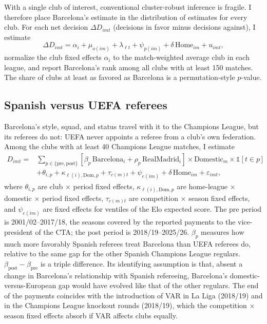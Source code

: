 With a single club of interest, conventional cluster-robust inference is fragile. I therefore place Barcelona's estimate in the distribution of estimates for every club. For each net decision $\Delta D_{imt}$ (decisions in favor minus decisions against), I estimate
\begin{equation}\label{eq:ranks}
\Delta D_{imt} = \alpha_i + \mu_{o(im)} + \lambda_{\ell t} + \psi_{p(im)} + \delta\, \text{Home}_{im} + u_{imt},
\end{equation}
normalize the club fixed effects $\alpha_i$ to the match-weighted average club in each league, and report Barcelona's rank among all clubs with at least 150 matches. The share of clubs at least as favored as Barcelona is a permutation-style $p$-value.

\subsection{Spanish versus UEFA referees}

Barcelona's style, squad, and status travel with it to the Champions League, but its referees do not: UEFA never appoints a referee from a club's own federation. Among the clubs with at least 40 Champions League matches, I estimate
\begin{equation}\label{eq:ddd}
\begin{split}
D_{imt} = {} & \sum_{p \in \{\text{pre},\text{post}\}} \left[\beta_p\, \text{Barcelona}_i + \rho_p\, \text{RealMadrid}_i\right] \times \text{Domestic}_m \times \mathbb{1}[t \in p] \\
& + \theta_{i,p} + \kappa_{\ell(i), \text{Dom}, p} + \tau_{c(m) t} + \psi_{e(im)} + \delta\, \text{Home}_{im} + \varepsilon_{imt},
\end{split}
\end{equation}
where $\theta_{i,p}$ are club $\times$ period fixed effects, $\kappa_{\ell(i),\text{Dom},p}$ are home-league $\times$ domestic $\times$ period fixed effects, $\tau_{c(m)t}$ are competition $\times$ season fixed effects, and $\psi_{e(im)}$ are fixed effects for ventiles of the Elo expected score. The pre period is 2001/02--2017/18, the seasons covered by the reported payments to the vice-president of the CTA; the post period is 2018/19--2025/26. $\beta_p$ measures how much more favorably Spanish referees treat Barcelona than UEFA referees do, relative to the same gap for the other Spanish Champions League regulars. $\beta_{\text{post}} - \beta_{\text{pre}}$ is a triple difference. Its identifying assumption is that, absent a change in Barcelona's relationship with Spanish refereeing, Barcelona's domestic-versus-European gap would have evolved like that of the other regulars. The end of the payments coincides with the introduction of VAR in La Liga (2018/19) and in the Champions League knockout rounds (2018/19), which the competition $\times$ season fixed effects absorb if VAR affects clubs equally.

